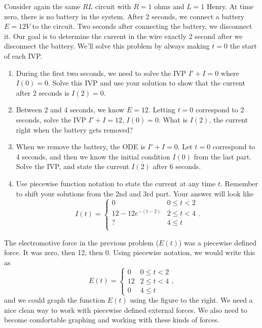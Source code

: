 \begin{problem}
 Consider again the same $RL$ circuit with $R=1$ ohms and $L=1$ Henry.  At time zero, there is no battery in the system.  After 2 seconds,  we connect a battery $E=12 V$ to the circuit.  Two seconds after connecting the battery, we disconnect it.  Our goal is to determine the current in the wire exactly 2 second after we disconnect the battery. We'll solve this problem by always making $t=0$ the start of each IVP.
\begin{enumerate}
 \item During the first  two seconds, we need to solve the IVP $I'+I=0$ where $I(0)=0$.  Solve this IVP and use your solution to show that the current after 2 seconds is $I(2)=0$.
 \item Between 2 and 4 seconds, we know $E=12$. Letting $t=0$ correspond to 2 seconds, solve the IVP $I'+I=12$, $I(0)=0$. What is $I(2)$, the current right when the battery gets removed?
 \item When we remove the battery, the ODE is $I'+I=0$. Let $t=0$ correspond to 4 seconds, and then we know the initial condition $I(0)$ from the last part.  Solve the IVP, and state the current $I(2)$ after 6 seconds. 
 \item Use piecewise function notation to state the current at any time $t$. Remember to shift your solutions from the 2nd and 3rd part. Your answer will look like 
$$I(t) = 
\begin{cases}
 0 & 0\leq t< 2\\
 12-12e^{-(t-2)} & 2\leq t< 4\\
 ? & 4\leq t\\
\end{cases}
.$$ 
\end{enumerate}
\end{problem}

The electromotive force in the previous problem ($E(t)$) was a piecewise defined force. It was zero, then 12, then 0. Using piecewise notation, we would write this as
$$E(t) =
\begin{cases}
 0 & 0\leq t<2\\
 12 & 2\leq t<4\\
 0 & 4\leq t
\end{cases}
,$$
and we could graph the function $E(t)$ using the figure to the right.
We need a nice clean way to work with piecewise defined external forces.  We also need to become comfortable graphing and working with these kinds of forces.

